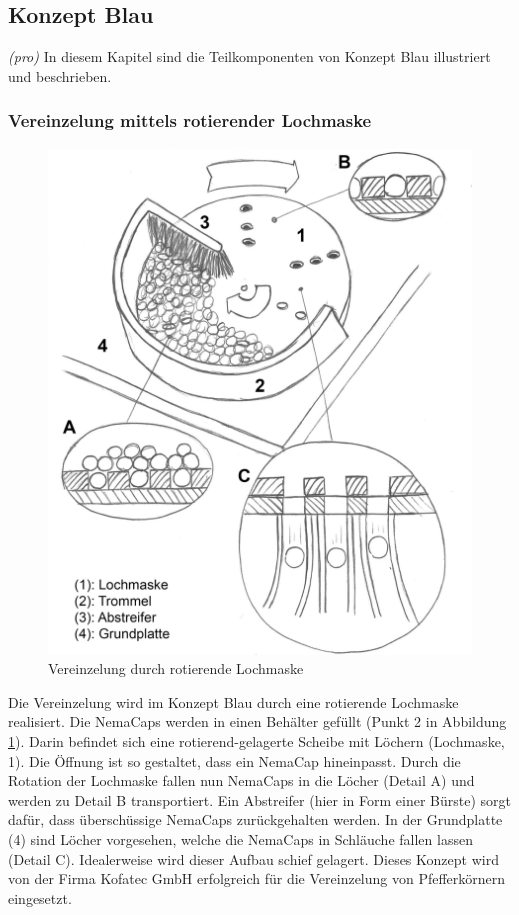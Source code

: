 \newpage
\subsection{Konzept Blau}
\textit{(pro)} In diesem Kapitel sind die Teilkomponenten von Konzept Blau illustriert und beschrieben.


\subsubsection{Vereinzelung mittels rotierender Lochmaske}
\begin{figure}
	\includegraphics[scale=0.52]{Illustrationen/5-Konzept/schema_vereinzelung.jpg}
	\caption{Vereinzelung durch rotierende Lochmaske}
	\label{fig:schema_vereinzelung}
\end{figure}
Die Vereinzelung wird im Konzept  Blau durch eine rotierende Lochmaske realisiert. Die NemaCaps werden in einen Behälter gefüllt (Punkt 2 in Abbildung \ref{fig:schema_vereinzelung}). Darin befindet sich eine rotierend-gelagerte Scheibe mit Löchern (Lochmaske, 1). Die Öffnung ist so gestaltet, dass ein NemaCap hineinpasst. Durch die Rotation der Lochmaske fallen nun NemaCaps in die Löcher (Detail A) und werden zu Detail B transportiert. Ein Abstreifer (hier in Form einer Bürste) sorgt dafür, dass überschüssige NemaCaps zurückgehalten werden. In der Grundplatte (4) sind Löcher vorgesehen, welche die NemaCaps in Schläuche fallen lassen (Detail C). Idealerweise wird dieser Aufbau schief gelagert. 
\newline
Dieses Konzept wird von der Firma Kofatec GmbH erfolgreich für die Vereinzelung von Pfefferkörnern eingesetzt. 

